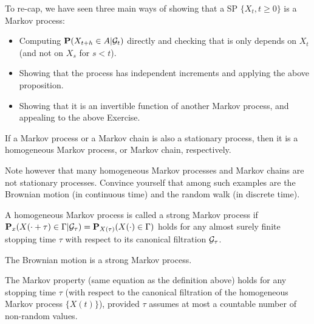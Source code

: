 \begin{remark*} 
To re-cap, we have seen three main ways of showing that a SP $\{X_t, t \ge
0\}$ is a Markov process:
\begin{itemize}
\item Computing $\mathbf{P}(X_{t+h} \in A | \mathcal{G}_t)$ directly and checking that is only
depends on $X_t$ (and not on $X_s$ for $s < t$).

\item Showing that the process has independent increments and applying
the above proposition.

\item Showing that it is an invertible function of another Markov process, and
appealing to the above Exercise.
\end{itemize}
\end{remark*} 

\begin{proposition*} 
If a Markov process or a Markov chain is also a stationary process, then it is a
homogeneous Markov process, or Markov chain, respectively.
\end{proposition*} 

\begin{remark*} 
Note however that many homogeneous Markov processes and Markov chains are not
stationary processes. Convince yourself that among such examples are the
Brownian motion (in continuous time) and the random walk (in discrete time).
\end{remark*} 

\begin{definition*} 
A homogeneous Markov process is called a strong Markov process if
$\mathbf{P}_x(X(\cdot + \tau) \in \Gamma | \mathcal{G}_\tau) = \mathbf{P}_{X(\tau)} (X(\cdot)
\in \Gamma)$ holds for any almost surely finite stopping time $\tau$ with
respect to its canonical filtration $\mathcal{G}_\tau$.
\end{definition*} 

\begin{corollary*} 
The Brownian motion is a strong Markov process.
\end{corollary*} 

\begin{proposition*} 
The Markov property (same equation as the definition above) holds for any
stopping time $\tau$ (with respect to the canonical filtration of the
homogeneous Markov process $\{X(t)\}$), provided $\tau$ assumes at most a
countable number of non-random values.
\end{proposition*} 







